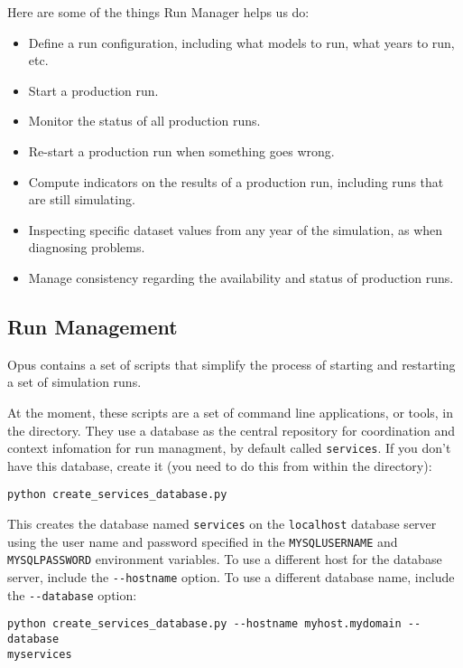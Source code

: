 Here are some of the things Run Manager \runmanagerindex helps us do:
\begin{itemize}
  \item Define a run configuration, including what models \modelsindex to run, what years to
  run, etc.
  \item Start a production run.
  \item Monitor the status of all production runs.
  \item Re-start a production run when something goes wrong.
  \item Compute indicators on the results of a production run, including runs
  that are still simulating.
  \item Inspecting specific dataset values from any year of the simulation,
  as when diagnosing problems.
  \item Manage consistency regarding the availability and status of production runs.
\end{itemize}

\subsection{Run Management}
\label{sec:run-manager}
%
Opus contains a set of scripts that simplify the
process of starting and restarting a set of simulation runs.

At the moment, these scripts are a set of command line applications, or tools, in the
 directory.  They use a database as the central
repository for coordination and context infomation for run managment, by
default called \verb|services|.  If you don't have this database, create it
(you need to do this from within the 
directory):
\pythonindex
\begin{verbatim}
python create_services_database.py
\end{verbatim}
This creates the database named \verb|services| on the \verb|localhost|
database server using the user name and password specified in the
\verb|MYSQLUSERNAME| \mysqlusernameindex and \verb|MYSQLPASSWORD| \mysqlpasswordindex environment variables. \environmentvariablesindex To use a
different host for the database server, include the \verb|--hostname|
option. To use a different database name, include the \verb|--database|
option:
\pythonindex
\begin{verbatim}
python create_services_database.py --hostname myhost.mydomain --database
myservices
\end{verbatim}

